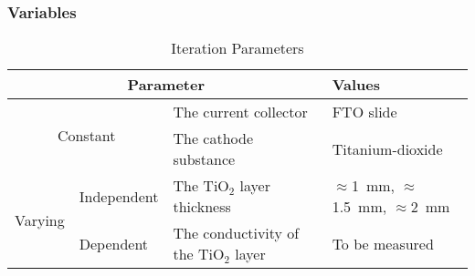 \subsubsection{Variables}
\begin{table}[h]
\renewcommand{\arraystretch}{1.3}
\caption{Iteration Parameters}
\label{table:parameterscathode}
\centering
\begin{tabular}{l|l|l||l}
\multicolumn{3}{c||}{\bfseries Parameter}&\bfseries Values\\
\hline
\hline
\multicolumn{2}{c|}{\multirow{2}{*}{Constant}}&The current collector&FTO slide\\
\cline{3-4}
\multicolumn{2}{c|}{}&The cathode substance&Titanium-dioxide\\
\hline\hline
\multirow{2}{*}{Varying}&Independent&The TiO$_2$ layer thickness&$\approx$\SI{1}{\mm}, $\approx$\SI{1.5}{\mm}, $\approx$\SI{2}{\mm}\\
\cline{2-4}
&Dependent&The conductivity of the TiO$_2$ layer&To be measured\\
\end{tabular}
\end{table}
            
